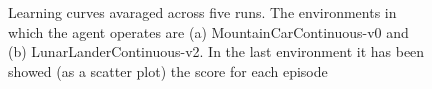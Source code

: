 \documentclass[11pt]{article}
\begin{document}
\begin{figure}[h!]
        \caption{ Learning curves avaraged across five runs. 
                The environments in which the agent operates are 
                (a) MountainCarContinuous-v0 and (b) LunarLanderContinuous-v2.
                In the last environment it has been showed (as a scatter plot) the score
                for each episode}
        \label{fig:plots}
\end{figure}
\end{document}
